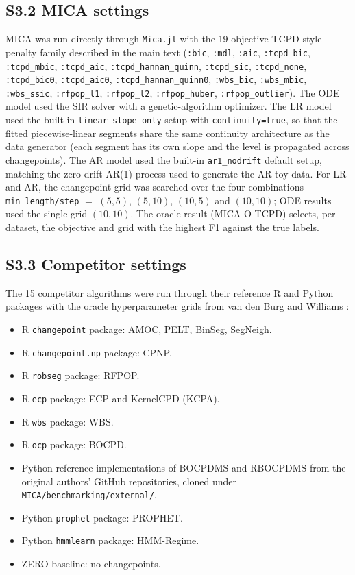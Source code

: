 \documentclass[11pt,a4paper]{article}
\begin{document}
\subsection*{S3.2 MICA settings}

MICA was run directly through \texttt{Mica.jl} with the 19-objective TCPD-style penalty family described in the main text (\texttt{:bic}, \texttt{:mdl}, \texttt{:aic}, \texttt{:tcpd\_bic}, \texttt{:tcpd\_mbic}, \texttt{:tcpd\_aic}, \texttt{:tcpd\_hannan\_quinn}, \texttt{:tcpd\_sic}, \texttt{:tcpd\_none}, \texttt{:tcpd\_bic0}, \texttt{:tcpd\_aic0}, \texttt{:tcpd\_hannan\_quinn0}, \texttt{:wbs\_bic}, \texttt{:wbs\_mbic}, \texttt{:wbs\_ssic}, \texttt{:rfpop\_l1}, \texttt{:rfpop\_l2}, \texttt{:rfpop\_huber}, \texttt{:rfpop\_outlier}). The ODE model used the SIR solver with a genetic-algorithm optimizer. The LR model used the built-in \texttt{linear\_slope\_only} setup with \texttt{continuity=true}, so that the fitted piecewise-linear segments share the same continuity architecture as the data generator (each segment has its own slope and the level is propagated across changepoints). The AR model used the built-in \texttt{ar1\_nodrift} default setup, matching the zero-drift AR(1) process used to generate the AR toy data. For LR and AR, the changepoint grid was searched over the four combinations \texttt{min\_length/step} $=$ $(5,5)$, $(5,10)$, $(10,5)$ and $(10,10)$; ODE results used the single grid $(10,10)$. The oracle result (MICA-O-TCPD) selects, per dataset, the objective and grid with the highest F1 against the true labels.

\subsection*{S3.3 Competitor settings}

The 15 competitor algorithms were run through their reference R and Python packages with the oracle hyperparameter grids from van den Burg and Williams \cite{vandenburg2020evaluation}:
\begin{itemize}
    \item R \texttt{changepoint} package: AMOC, PELT, BinSeg, SegNeigh.
    \item R \texttt{changepoint.np} package: CPNP.
    \item R \texttt{robseg} package: RFPOP.
    \item R \texttt{ecp} package: ECP and KernelCPD (KCPA).
    \item R \texttt{wbs} package: WBS.
    \item R \texttt{ocp} package: BOCPD.
    \item Python reference implementations of BOCPDMS and RBOCPDMS from the original authors' GitHub repositories, cloned under \texttt{MICA/benchmarking/external/}.
    \item Python \texttt{prophet} package: PROPHET.
    \item Python \texttt{hmmlearn} package: HMM-Regime.
    \item ZERO baseline: no changepoints.
\end{itemize}
\end{document}
